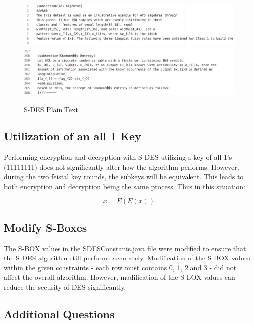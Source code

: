 \documentclass[]{article}
\begin{document}
\begin{figure}[H]
	\includegraphics[width=\textwidth]{sdes_plain1.png}
	\includegraphics[width=\textwidth]{sdes_plain2.png}	
	\caption{S-DES Plain Text}
	\centering
\end{figure}

\subsection*{Utilization of an all 1 Key}

Performing encryption and decryption with S-DES utilizing a key of all 1's (11111111) does not significantly alter how the algorithm performs. However, during the two feistal key rounds, the subkeys will be equivalent. This leads to both encryption and decryption being the same process. Thus in this situation:

$$x=E( E(x) )$$

\subsection*{Modify S-Boxes}


The S-BOX values in the SDESConstants.java file were modified to ensure that the S-DES algorithm still performs accurately. Modification of the S-BOX values within the given constraints - each row must contains 0, 1, 2 and 3 - did not affect the overall algorithm. However, modification of the S-BOX values can reduce the security of DES significantly.

\break

\vspace*{-0.8cm}
\begin{center}
	\section*{Additional Questions}
\end{center}
\end{document}
